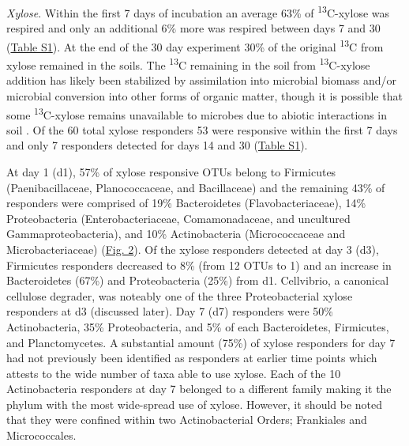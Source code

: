 \textit{Xylose}. Within the first 7 days of incubation an average 63\% of \textsuperscript{13}C-xylose was respired and only an additional 6\% more was respired between days 7 and 30 (\href{https://authorea.com/users/3537/articles/8459/master/file/figures/resp_table/resp_table.png}{Table S1}). At the end of the 30 day experiment 30\% of the original \textsuperscript{13}C from xylose remained in the soils. The \textsuperscript{13}C remaining in the soil from \textsuperscript{13}C-xylose addition has likely been stabilized by assimilation into microbial biomass and/or microbial conversion into other forms of organic matter, though it is possible that some \textsuperscript{13}C-xylose remains unavailable to microbes due to abiotic interactions in soil \cite{Kalbitz_2000}. Of the 60 total xylose responders 53 were responsive within the first 7 days and only 7 responders detected for days 14 and 30 (\href{https://authorea.com/users/3537/articles/8459/master/file/figures/resp_table/resp_table.png}{Table S1}). 

At day 1 (d1), 57\% of xylose responsive OTUs belong to Firmicutes (Paenibacillaceae, Planococcaceae, and Bacillaceae) and the remaining 43\% of responders were comprised of 19\% Bacteroidetes (Flavobacteriaceae), 14\% Proteobacteria (Enterobacteriaceae, Comamonadaceae, and uncultured Gammaproteobacteria), and 10\% Actinobacteria (Micrococcaceae and Microbacteriaceae) (\href{https://www.authorea.com/users/3537/articles/3612/master/file/figures/l2fc_fig1/l2fc_fig.pdf}{Fig. 2}). Of the xylose responders detected at day 3 (d3), Firmicutes responders decreased to 8\% (from 12 OTUs to 1) and an increase in Bacteroidetes (67\%) and Proteobacteria (25\%) from d1. Cellvibrio, a canonical cellulose degrader, was noteably one of the three Proteobacterial xylose responders at d3 (discussed later). Day 7 (d7) responders were 50\% Actinobacteria, 35\% Proteobacteria, and 5\% of each Bacteroidetes, Firmicutes, and Planctomycetes. A substantial amount (75\%) of xylose responders for day 7 had not previously been identified as responders at earlier time points which attests to the wide number of taxa able to use xylose. Each of the 10 Actinobacteria responders at day 7 belonged to a different family making it the phylum with the most wide-spread use of xylose. However, it should be noted that they were confined within two Actinobacterial Orders; Frankiales and Micrococcales. 

